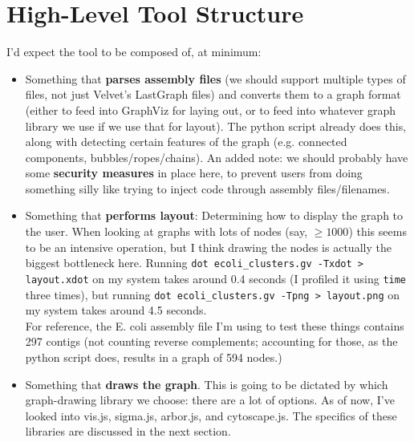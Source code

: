 \documentclass[12pt]{article}
\begin{document}
\section{High-Level Tool Structure}

I'd expect the tool to be composed of, at minimum:

\begin{itemize}
	\item Something that \textbf{parses assembly files} (we should support multiple
	types of files, not just Velvet's LastGraph files) and converts
	them to a graph format (either to feed into GraphViz for laying
	out, or to feed into whatever graph library we use if we use that
	for layout). The python script already does this, along with
	detecting certain features of the graph (e.g. connected components, 
	bubbles/ropes/chains).
	An added note: we should probably have some \textbf{security measures} in place here, to prevent users from doing something silly like trying
	to inject code through assembly files/filenames.
\item Something that \textbf{performs layout}: Determining how to display the graph
	to the user. When looking at graphs with lots of nodes (say,
	$\geq 1000$) this seems to be an intensive operation, but I think
	drawing the nodes is actually the biggest bottleneck here. Running
	\texttt{dot ecoli\_clusters.gv -Txdot > layout.xdot} on my
	system takes around 0.4 seconds (I profiled it using \texttt{time}
	three times), but running \texttt{dot ecoli\_clusters.gv -Tpng >
	layout.png} on my system takes around 4.5 seconds. \\
	For reference, the E. coli assembly file I'm using to test these
	things contains 297 contigs (not counting reverse complements;
	accounting for those, as the python script does, results in a graph
	of 594 nodes.)
\item Something that \textbf{draws the graph}. This is going to be dictated by which
	graph-drawing library we choose: there are a lot of options. As of
	now, I've looked into vis.js, sigma.js, arbor.js, and cytoscape.js.
	The specifics of these libraries are discussed in the next section.


\end{itemize}
\end{document}
